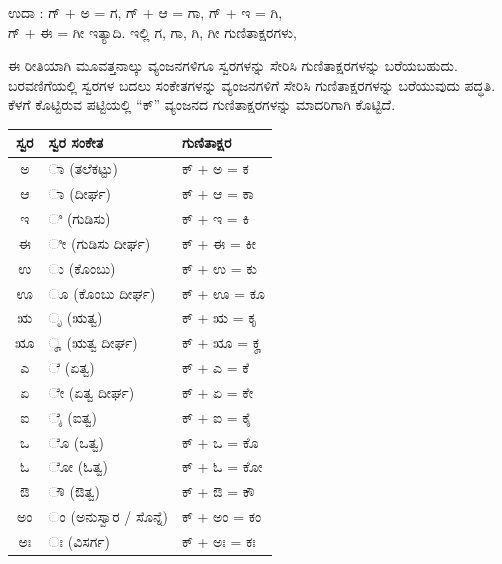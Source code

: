 \begin{kbvderiv}
\vspace{3pt plus 3pt minus 1pt}
\hspace*{1.8em}ಉದಾ : ಗ್‌ + ಅ = ಗ, ಗ್‌ + ಆ = ಗಾ, ಗ್‌ + ಇ = ಗಿ, \\
\hspace*{1.8em}ಗ್‌ + ಈ = ಗೀ ಇತ್ಯಾದಿ. ಇಲ್ಲಿ ಗ, ಗಾ, ಗಿ, ಗೀ ಗುಣಿತಾಕ್ಷರಗಳು,
\vspace{3pt plus 3pt minus 1pt}
\end{kbvderiv}

\indent ಈ ರೀತಿಯಾಗಿ ಮೂವತ್ತನಾಲ್ಕು ವ್ಯಂಜನಗಳಿಗೂ ಸ್ವರಗಳನ್ನು ಸೇರಿಸಿ ಗುಣಿತಾಕ್ಷರಗಳನ್ನು ಬರೆಯಬಹುದು. ಬರವಣಿಗೆಯಲ್ಲಿ ಸ್ವರಗಳ ಬದಲು ಸಂಕೇತಗಳನ್ನು ವ್ಯಂಜನಗಳಿಗೆ ಸೇರಿಸಿ ಗುಣಿತಾಕ್ಷರಗಳನ್ನು ಬರೆಯುವುದು ಪದ್ಧತಿ. ಕೆಳಗೆ ಕೊಟ್ಟಿರುವ ಪಟ್ಟಿಯಲ್ಲಿ “ಕ್‌” ವ್ಯಂಜನದ ಗುಣಿತಾಕ್ಷರಗಳನ್ನು ಮಾದರಿಗಾಗಿ ಕೊಟ್ಟಿದೆ.\par


\vspace{5pt plus 4pt minus 1pt}
\begin{center}
{\renewcommand{\arraystretch}{1.20}\setlength{\tabcolsep}{10pt}
\begin{tabular}{c | l | l}
\toprule
{\kbvsecfont ಸ್ವರ} & {\kbvsecfont ಸ್ವರ ಸಂಕೇತ} & {\kbvsecfont ಗುಣಿತಾಕ್ಷರ} \\
\midrule
ಅ & ಾ (ತಲೆಕಟ್ಟು) & ಕ್‌ + ಅ = ಕ \\
ಆ & ಾ (ದೀರ್ಘ) & ಕ್‌ + ಆ = ಕಾ \\
ಇ & ಿ (ಗುಡಿಸು) & ಕ್‌ + ಇ = ಕಿ \\
ಈ & ೀ (ಗುಡಿಸು ದೀರ್ಘ) & ಕ್‌ + ಈ = ಕೀ \\
ಉ & ು (ಕೊಂಬು) & ಕ್‌ + ಉ = ಕು \\
ಊ & ೂ (ಕೊಂಬು ದೀರ್ಘ) & ಕ್‌ + ಊ = ಕೂ \\
ಋ & ೃ (ಋತ್ವ) & ಕ್‌ + ಋ = ಕೃ \\
ೠ & ೄ (ಋತ್ವ ದೀರ್ಘ) & ಕ್‌ + ೠ = ಕೄ \\
ಎ & ೆ (ಏತ್ವ) & ಕ್‌ + ಎ = ಕೆ \\
ಏ & ೇ (ಏತ್ವ ದೀರ್ಘ) & ಕ್‌ + ಏ = ಕೇ \\
ಐ & ೈ (ಐತ್ವ) & ಕ್‌ + ಐ = ಕೈ \\
ಒ & ೊ (ಒತ್ವ) & ಕ್‌ + ಒ = ಕೊ \\
ಓ & ೋ (ಓತ್ವ) & ಕ್‌ + ಓ = ಕೋ \\
ಔ & ೌ (ಔತ್ವ) & ಕ್‌ + ಔ = ಕೌ \\
ಅಂ & ಂ (ಅನುಸ್ವಾರ / ಸೊನ್ನೆ) & ಕ್‌ + ಅಂ = ಕಂ \\
ಅಃ & ಃ (ವಿಸರ್ಗ) & ಕ್‌ + ಅಃ = ಕಃ \\
\bottomrule
\end{tabular}}
\end{center}
\vspace{5pt plus 4pt minus 1pt}
